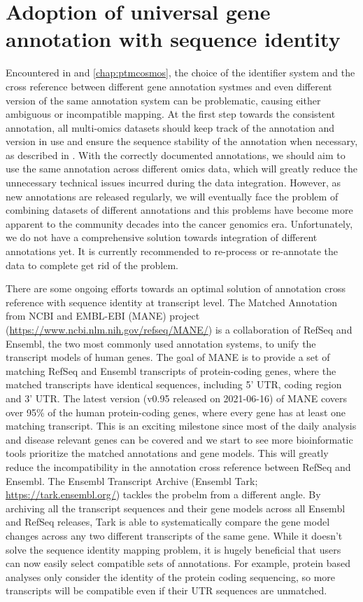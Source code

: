 \section{Adoption of universal gene annotation with sequence identity}
Encountered in  and \ref{chap:ptmcosmos}, the choice of the identifier system and the cross reference between different gene annotation systmes and even different version of the same annotation system can be problematic, causing either ambiguous or incompatible mapping. At the first step towards the consistent annotation, all multi-omics datasets should keep track of the annotation and version in use and ensure the sequence stability of the annotation when necessary, as described in . With the correctly documented annotations, we should aim to use the same annotation across different omics data, which will greatly reduce the unnecessary technical issues incurred during the data integration. However, as new annotations are released regularly, we will eventually face the problem of combining datasets of different annotations and this problems have become more apparent to the community decades into the cancer genomics era. Unfortunately, we do not have a comprehensive solution towards integration of different annotations yet. It is currently recommended to re-process or re-annotate the data to complete get rid of the problem.

There are some ongoing efforts towards an optimal solution of annotation cross reference with sequence identity at transcript level. The Matched Annotation from NCBI and EMBL-EBI (MANE) project (\url{https://www.ncbi.nlm.nih.gov/refseq/MANE/}) is a collaboration of RefSeq and Ensembl, the two most commonly used annotation systems, to unify the transcript models of human genes. The goal of MANE is to provide a set of matching RefSeq and Ensembl transcripts of protein-coding genes, where the matched transcripts have identical sequences, including 5' UTR, coding region and 3' UTR. The latest version (v0.95 released on 2021-06-16) of MANE covers over 95\% of the human protein-coding genes, where every gene has at least one matching transcript. This is an exciting milestone since most of the daily analysis and disease relevant genes can be covered and we start to see more bioinformatic tools prioritize the matched annotations and gene models. This will greatly reduce the incompatibility in the annotation cross reference between RefSeq and Ensembl. The Ensembl Transcript Archive (Ensembl Tark; \url{https://tark.ensembl.org/}) tackles the probelm from a different angle. By archiving all the transcript sequences and their gene models across all Ensembl and RefSeq releases, Tark is able to systematically compare the gene model changes across any two different transcripts of the same gene. While it doesn't solve the sequence identity mapping problem, it is hugely beneficial that users can now easily select compatible sets of annotations. For example, protein based analyses only consider the identity of the protein coding sequencing, so more transcripts will be compatible even if their UTR sequences are unmatched.


